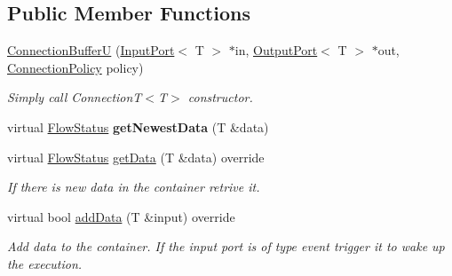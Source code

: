 \subsection*{Public Member Functions}
\begin{DoxyCompactItemize}
\item 
\hypertarget{classcoco_1_1_connection_buffer_u_aebbc3c18dd8b27f11dcdc83b15f24770}{\hyperlink{classcoco_1_1_connection_buffer_u_aebbc3c18dd8b27f11dcdc83b15f24770}{Connection\-Buffer\-U} (\hyperlink{classcoco_1_1_input_port}{Input\-Port}$<$ T $>$ $\ast$in, \hyperlink{classcoco_1_1_output_port}{Output\-Port}$<$ T $>$ $\ast$out, \hyperlink{structcoco_1_1_connection_policy}{Connection\-Policy} policy)}\label{classcoco_1_1_connection_buffer_u_aebbc3c18dd8b27f11dcdc83b15f24770}

\begin{DoxyCompactList}\small\item\em Simply call Connection\-T$<$\-T$>$ constructor. \end{DoxyCompactList}\item 
\hypertarget{classcoco_1_1_connection_buffer_u_a853c1a94c0d2e3c937298860a5c8cbe3}{virtual \hyperlink{namespacecoco_a057be58377e415c9be98c1dc5c8426ad}{Flow\-Status} {\bfseries get\-Newest\-Data} (T \&data)}\label{classcoco_1_1_connection_buffer_u_a853c1a94c0d2e3c937298860a5c8cbe3}

\item 
\hypertarget{classcoco_1_1_connection_buffer_u_ab66b2f4a90e2757c796497f38c8e1695}{virtual \hyperlink{namespacecoco_a057be58377e415c9be98c1dc5c8426ad}{Flow\-Status} \hyperlink{classcoco_1_1_connection_buffer_u_ab66b2f4a90e2757c796497f38c8e1695}{get\-Data} (T \&data) override}\label{classcoco_1_1_connection_buffer_u_ab66b2f4a90e2757c796497f38c8e1695}

\begin{DoxyCompactList}\small\item\em If there is new data in the container retrive it. \end{DoxyCompactList}\item 
\hypertarget{classcoco_1_1_connection_buffer_u_a9cedcd1db28cb0bc70adda82e25538e1}{virtual bool \hyperlink{classcoco_1_1_connection_buffer_u_a9cedcd1db28cb0bc70adda82e25538e1}{add\-Data} (T \&input) override}\label{classcoco_1_1_connection_buffer_u_a9cedcd1db28cb0bc70adda82e25538e1}

\begin{DoxyCompactList}\small\item\em Add data to the container. If the input port is of type event trigger it to wake up the execution. \end{DoxyCompactList}\end{DoxyCompactItemize}
